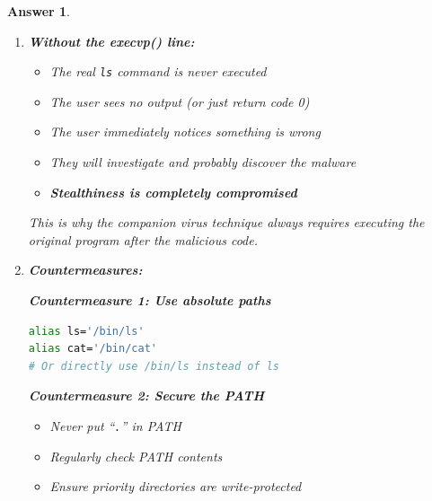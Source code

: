 \documentclass[a4paper,11pt]{article}
\theoremstyle{plain}
\newtheorem{correction}{Answer}
\theoremstyle{definition}
\begin{document}
\begin{correction}
\begin{enumerate}
\begin{attention}[title={Why you should never put ``\texttt{.}'' in PATH}]
If the current directory (\texttt{.}) is in PATH (especially in the first position), an attacker can place a malicious executable named \texttt{ls}, \texttt{cat}, or \texttt{sudo} in \textbf{any directory} visited by the victim (e.g., \texttt{/tmp}, a shared folder). The victim only needs to run a common command in that directory to launch the malware.

This is why modern Linux distributions \textbf{never} include \texttt{.} in PATH by default. On Windows, the current directory is searched first, which has historically caused numerous vulnerabilities (DLL hijacking, etc.).
\end{attention}

\item \textbf{Without the execvp() line:}

\begin{itemize}
\item The real \texttt{ls} command is never executed
\item The user sees no output (or just return code 0)
\item The user immediately notices something is wrong
\item They will investigate and probably discover the malware
\item \textbf{Stealthiness is completely compromised}
\end{itemize}

This is why the companion virus technique always requires executing the original program after the malicious code.

\item \textbf{Countermeasures:}

\textbf{Countermeasure 1: Use absolute paths}
\begin{lstlisting}[language=bash,numbers=none]
alias ls='/bin/ls'
alias cat='/bin/cat'
# Or directly use /bin/ls instead of ls
\end{lstlisting}

\textbf{Countermeasure 2: Secure the PATH}
\begin{itemize}
\item Never put ``\texttt{.}'' in PATH
\item Regularly check PATH contents
\item Ensure priority directories are write-protected
\end{itemize}


\end{enumerate}
\end{correction}
\end{document}
